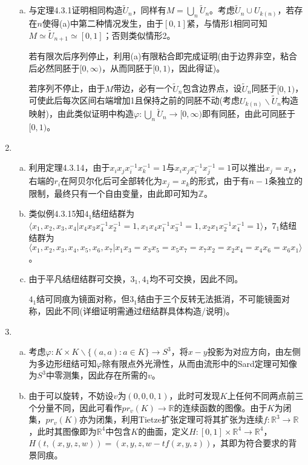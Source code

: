\documentclass[a4paper,UTF8,fontset=windows]{ctexart}
\begin{document}
\begin{enumerate}[(1)]
\begin{enumerate}[(a)]
    \item
    与定理4.3.1证明相同构造$\widetilde{U}_n$，同样有$M=\bigcup_n\widetilde{U}_n$。考虑$\widetilde{U}_n\cup U_{k(n)}$，若存在$n$使得(a)中第二种情况发生，由于$[0,1]$紧，与情形1相同可知$M\simeq\widetilde{U}_{n+1}\simeq[0,1]$；否则类似情形2。
    
    若有限次后序列停止，利用(a)有限粘合即完成证明(由于边界非空，粘合后必然同胚于$[0,\infty)$，从而同胚于$[0,1)$，因此得证)。
    
    若序列不停止，由于$M$带边，必有一个$\widetilde{U}_n$包含边界点，设$\widetilde{U}_n$同胚于$[0,1)$，可使此后每次区间右端增加1且保持之前的同胚不动(考虑$U_{k(n)}\backslash\widetilde{U}_n$构造映射)，由此类似证明中构造$\varphi:\bigcup_n\widetilde{U}_n\to[0,\infty)$即有同胚，由此可同胚于$[0,1)$。
    \end{enumerate}
    
    \item
    \begin{enumerate}[(a)]
    \item
    利用定理4.3.14，由于$x_ix_jx_i^{-1}x_k^{-1}=1$与$x_ix_jx_i^{-1}x_j^{-1}=1$可以推出$x_j=x_k$，右端的$r_i$在阿贝尔化后可全部转化为$x_j=x_k$的形式，由于有$n-1$条独立的限制，最终只有一个自由变量，由此即可知为$\mathbb{Z}$。
    
    \item
    类似例4.3.15知$4_1$结纽结群为$\langle x_1,x_2,x_3,x_4|x_4x_3x_4^{-1}x_2^{-1}=1,x_1x_4x_1^{-1}x_3^{-1}=1,x_2x_1x_2^{-1}x_4^{-1}=1\rangle$，$7_1$结纽结群为$\langle x_1,x_2,x_3,x_4,x_5,x_6,x_7|x_1x_3=x_3x_5=x_5x_7=x_7x_2=x_2x_4=x_4x_6=x_6x_1\rangle$。
    
    \item
    由于平凡结纽结群可交换，$3_1,4_1$均不可交换，因此不同。
    
    $4_1$结可同痕为镜面对称，但$3_1$结由于三个反转无法抵消，不可能镜面对称，因此不同(详细证明需通过纽结群具体构造/说明)。
    \end{enumerate}
    
    \item
    \begin{enumerate}[(a)]
    \item
    考虑$\varphi:K\times K\backslash\{(a,a):a\in K\}\to S^3$，将$x-y$投影为对应方向，由左侧为多边形纽结可知$\varphi$除有限点外光滑性，从而由流形中的Sard定理可知像为$S^3$中零测集，因此存在所需的$v$。
    
    \item
    由于可以旋转，不妨设$v$为$(0,0,0,1)$，此时可发现$K$上任何不同两点前三个分量不同，因此可看作$pr_v(K)\to\mathbb{R}$的连续函数的图像。由于$K$为闭集，$pr_v(K)$亦为闭集，利用Tietze扩张定理可将其扩张为连续$f:\mathbb{R}^3\to\mathbb{R}$，此时其图像即为$\mathbb{R}^4$中包含$K$的曲面，定义$H:[0,1]\times\mathbb{R}^4\to\mathbb{R}^4$，$H(t,(x,y,z,w))=(x,y,z,w-tf(x,y,z))$，其即为符合要求的背景同痕。
    

\end{enumerate}
\end{enumerate}
\end{document}
